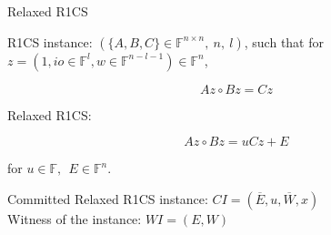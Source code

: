 \documentclass[t]{beamer}
\begin{document}
\begin{frame}{Relaxed R1CS}

  R1CS instance: $(\{A, B, C\} \in \mathbb{F}^{n \times n},~ n,~ l)$, such that for $z=(1, io \in \mathbb{F}^l, w \in \mathbb{F}^{n-l-1}) \in \mathbb{F}^n$,

$$Az \circ Bz = Cz$$


Relaxed R1CS:

$$Az \circ Bz = uCz + E$$

for $u \in \mathbb{F},~~ E \in \mathbb{F}^n$.

\vspace{1cm}

Committed Relaxed R1CS instance: $CI = (\overline{E}, u, \overline{W}, x)$\\
Witness of the instance: $WI=(E, W)$

\end{frame}
\end{document}
